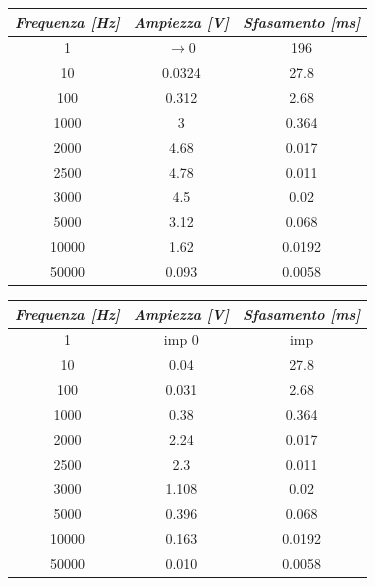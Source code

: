     \begin{table} [!ht]
        \begin{minipage}{.525\linewidth}
            \centering
            \begin{tabular}{|c|c|c|}
                \hline
                \textit{Frequenza [Hz]} & \textit{Ampiezza [V]} & \textit{Sfasamento [ms]} \\
                \hline
                1 & $\longrightarrow 0$ & 196 \\
                \hline
                10 & 0.0324 & 27.8 \\
                \hline
                100 & 0.312 & 2.68 \\
                \hline
                1000 & 3 & 0.364 \\
                \hline
                2000 & 4.68 & 0.017 \\
                \hline
                2500 & 4.78 & 0.011 \\
                \hline
                3000 & 4.5 & 0.02 \\
                \hline
                5000 & 3.12 & 0.068 \\
                \hline
                10000 & 1.62 & 0.0192 \\
                \hline
                50000 & 0.093 & 0.0058 \\
                \hline
            \end{tabular}
        \end{minipage}
        \begin{minipage}{.525\linewidth}
            \centering
            \begin{tabular}{|c|c|c|}
                \hline
                \textit{Frequenza [Hz]} & \textit{Ampiezza [V]} & \textit{Sfasamento [ms]} \\
                \hline
                1 & imp 0 & imp \\
                \hline
                10 & 0.04 & 27.8 \\
                \hline
                100 & 0.031 & 2.68 \\
                \hline
                1000 & 0.38 & 0.364 \\
                \hline
                2000 & 2.24 & 0.017 \\
                \hline
                2500 & 2.3 & 0.011 \\
                \hline
                3000 & 1.108 & 0.02 \\
                \hline
                5000 & 0.396 & 0.068 \\
                \hline
                10000 & 0.163 & 0.0192 \\
                \hline
                50000 & 0.010 & 0.0058 \\
                \hline
            \end{tabular}
        \end{minipage}
    \end{table}

